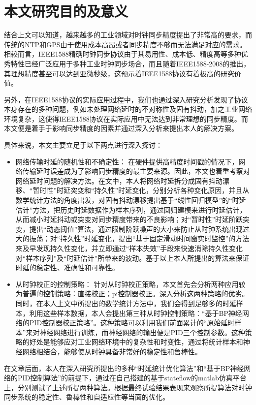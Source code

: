 \section{本文研究目的及意义}
结合上文可以知道，越来越多的工业领域对时钟同步精度提出了非常高的要求，而传统的NTP和GPS由于使用成本高昂或者同步精度不够而无法满足对应的需求。相较而言，IEEE1588精确时钟同步协议由于其易用性、成本低、精度高等多种优秀特性已经广泛应用于多种工业时钟同步场合，而且随着IEEE1588-2008的推出，其理想精度甚至可以达到亚微秒级，这预示着IEEE1588协议有着极高的研究价值。

另外，在IEEE1588协议的实际应用过程中，我们也通过深入研究分析发现了协议本身存在的多种问题，例如未处理网络延时的不对称性及固有抖动，加之工业网络环境复杂，这使得IEEE1588协议在实际应用中无法达到非常理想的同步精度。而本文便是着手于影响同步精度的因素并通过深入分析来提出本人的解决方案。

具体来说，本文主要立足于以下两点进行深入探讨：
\begin{itemize}[noitemsep,topsep=0pt,parsep=0pt,partopsep=0pt]
	\item 网络传输时延的随机性和不确定性：
在硬件提供高精度时间戳的情况下，网络传输延时误差成为了影响同步精度的最主要来源。因此，本文也着重考察对网络延时问题的解决方法。在文中，本人将网络时延拆分成固有抖动漂移、“暂时性”时延突变和“持久性”时延变化，分别分析各种变化原因，并且从数学统计方法的角度出发，对固有抖动漂移提出基于“线性回归模型”的“时延估计”方法，把历史时延数据作为样本序列，通过回归建模来进行时延估计，从而减小时延抖动或突变对同步精度带来的不良影响；对“暂时性”时延阶跃突变，提出“动态阈值”算法，通过限制阶跃噪声的大小来防止从时钟系统出现过大的振荡；对“持久性”时延变化，提出“基于固定滑动时间窗实时监控”的方法来及早发现持久性变化，并立即通过“样本失效”手段来快速消除持久性变化对“样本序列”及“时延估计”所带来的波动。基于以上本人所提出的算法来保证时延的稳定性、准确性和可靠性。
	\item 从时钟校正的控制策略：
针对从时钟校正策略，本文首先会分析两种应用较为普遍的控制策略：直接校正；pi控制器校正。深入分析这两种策略的优劣。同时，在本人上文中所提出的数学统计方法中，我们会得到足够多的时延样本，利用这些样本数据，本人会提出第三种从时钟控制策略：“基于BP神经网络的PID控制器校正策略”。这种策略可以利用我们前面累计的“原始延时样本”来对神经网络进行训练，而神经网络的输出便是PID三个控制参数。这种策略的好处是能够应对工业网络环境中的复杂性和时变性，通过将统计样本和神经网络相结合，能够使从时钟具备非常好的稳定性和鲁棒性。
\end{itemize}

在文章后面，本人在深入研究所提出的多种“时延统计优化算法”和“基于BP神经网络的PID控制算法”的前提下，通过在自己搭建的基于stateflow的matlab仿真平台上，分别测试了上述所提两种算法。根据最终试验结果表现来观察所提算法对时钟同步系统的稳定性、鲁棒性和自适应性等当面的优化。

